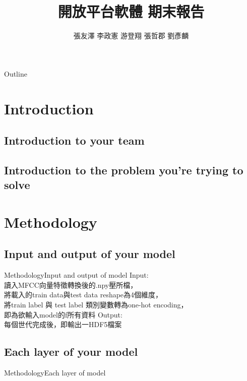 \documentclass{beamer}
\begin{document}
\begin{CJK}{UTF8}{nkai}
\title{開放平台軟體 期末報告}
\author{張友澤  李政憲  游登翔  張哲郡  劉彥麟 }

\begin{frame}
  \titlepage
\end{frame}

\begin{frame}[shrink]{Outline} 
\tableofcontents 
\end{frame}

\section{ Introduction}
\subsection{Introduction to your team}
\subsection{Introduction to the problem you're trying to solve}

\section{Methodology}
\subsection{Input and output of your model}
\begin{frame}{Methodology}{Input and output of model}
	Input:\\
	讀入MFCC向量特徵轉換後的.npy壓所檔，\\
	將載入的train data與test data reshape為4個維度，\\
	將train label 與 test label 類別變數轉為one-hot encoding，\\
	即為欲輸入model的f所有資料\newline\newline
	Output:\\
	每個世代完成後，即輸出一HDF5檔案\\
	
 \end{frame}

\subsection{Each layer of your model}
\begin{frame}{Methodology}{Each layer of model}


\end{frame}
\end{CJK}
\end{document}
